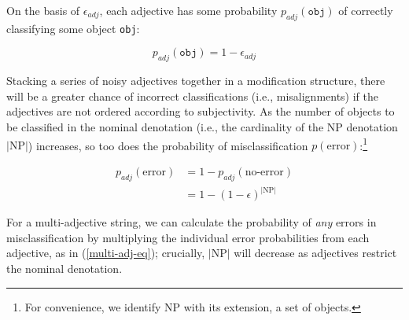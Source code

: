 \documentclass{sp}
\newcommand{\gcs}[1]{\textcolor{blue}{[gcs: #1]}}
\begin{document}
%
%
%
On the basis of $\epsilon_{adj}$, each adjective has some probability $p_{adj}(\texttt{obj})$ of correctly classifying some object \texttt{obj}: 

\setcounter{equation}{2}
\begin{equation}
p_{adj}(\texttt{obj}) = 1-\epsilon_{adj}
\end{equation}

\noindent
Stacking a series of noisy adjectives together in a modification structure, there will be a greater chance of incorrect classifications (i.e., misalignments) if the adjectives are not ordered according to subjectivity. %
As the number of objects to be classified in the nominal denotation (i.e., the cardinality of the NP denotation $|\textrm{NP}|$) increases, so too does the probability of misclassification $p(\textrm{error})$:\footnote{For convenience, we identify NP with its extension, a set of objects.} 
	
\setcounter{equation}{3}
\begin{align}
p_{adj}(\textrm{error}) &= 1 - p_{adj}(\textrm{no-error}) \nonumber\\
&= 1 - (1-\epsilon)^{|\textrm{NP}|}
\end{align}
	
For a multi-adjective string, we can calculate the probability of \emph{any} errors in misclassification by multiplying the individual error probabilities from each adjective, as in (\ref{multi-adj-eq}); crucially, $|\textrm{NP}|$ will decrease as adjectives restrict the nominal denotation. 
	
\end{document}
